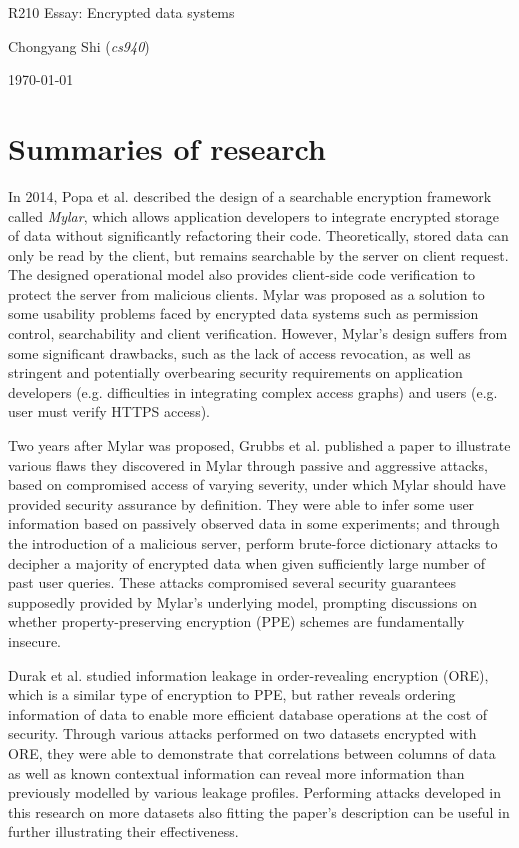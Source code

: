 \documentclass[11pt]{article}
\begin{document}
\centerline{\Large R210 Essay:  Encrypted data systems}
\vspace{2em}
\centerline{\large Chongyang Shi (\emph{cs940})}
\vspace{1em}
\centerline{\large \today}
\vspace{1em}

\section{Summaries of research}

In 2014, Popa et al. \cite{popa2014building} described the design of a searchable encryption framework called \emph{Mylar}, which allows application developers to integrate encrypted storage of data without significantly refactoring their code. Theoretically, stored data can only be read by the client, but remains searchable by the server on client request. The designed operational model also provides client-side code verification to protect the server from malicious clients. Mylar was proposed as a solution to some usability problems faced by encrypted data systems such as permission control, searchability and client verification. However, Mylar's design suffers from some significant drawbacks, such as the lack of access revocation, as well as stringent and potentially overbearing security requirements on application developers (e.g. difficulties in integrating complex access graphs) and users (e.g. user must verify HTTPS access).

Two years after Mylar was proposed, Grubbs et al. \cite{grubbs2016breaking} published a paper to illustrate various flaws they discovered in Mylar through passive and aggressive attacks, based on compromised access of varying severity, under which Mylar should have provided security assurance by definition. They were able to infer some user information based on passively observed data in some experiments; and through the introduction of a malicious server, perform brute-force dictionary attacks to decipher a majority of encrypted data when given sufficiently large number of past user queries. These attacks compromised several security guarantees supposedly provided by Mylar's underlying model, prompting discussions on whether property-preserving encryption (PPE) schemes are fundamentally insecure.

Durak et al. \cite{durak2016else} studied information leakage in order-revealing encryption (ORE), which is a similar type of encryption to PPE, but rather reveals ordering information of data to enable more efficient database operations at the cost of security. Through various attacks performed on two datasets encrypted with ORE, they were able to demonstrate that correlations between columns of data as well as known contextual information can reveal more information than previously modelled by various leakage profiles. Performing attacks developed in this research on more datasets also fitting the paper's description can be useful in further illustrating their effectiveness.
\end{document}
